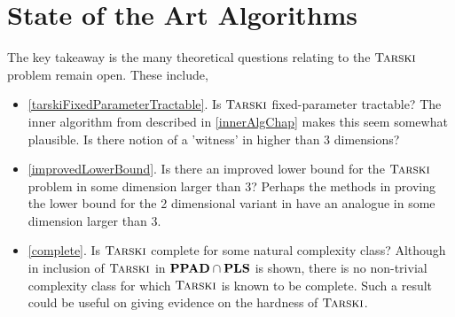 \section{State of the Art Algorithms}
The key takeaway is the many theoretical questions relating to the $\textsc{Tarski}$ problem
remain open. These include,
\begin{itemize}
  \item \cref{tarskiFixedParameterTractable}. Is $\textsc{Tarski}$ fixed-parameter tractable? The inner algorithm
    from \citep{fasterTarski} described in \cref{innerAlgChap} makes this seem somewhat plausible. Is
    there notion of a 'witness' in higher than 3 dimensions?
  \item \cref{improvedLowerBound}. Is there an improved lower bound for the $\textsc{Tarski}$ problem in some dimension
    larger than 3? Perhaps the methods in proving the lower bound for the 2 dimensional variant in \citep{lowerBound}
    have an analogue in some dimension larger than 3.
  \item \cref{complete}. Is $\textsc{Tarski}$ complete for some natural complexity class? Although in \citep{lowerBound}
    inclusion of $\textsc{Tarski}$ in $\mathbf{PPAD} \cap \mathbf{PLS}$ is shown, there is no non-trivial complexity class for
    which $\textsc{Tarski}$ is known to be complete. Such a result could be useful on giving evidence on the hardness of $\textsc{Tarski}$.
\end{itemize}

